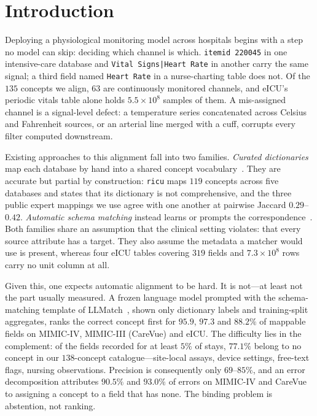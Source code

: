 \section{Introduction}

Deploying a physiological monitoring model across hospitals begins with a step no model
can skip: deciding which channel is which. \texttt{itemid 220045} in one intensive-care
database and \texttt{Vital Signs|Heart Rate} in another carry the same signal; a third
field named \texttt{Heart Rate} in a nurse-charting table does not. Of the $135$ concepts
we align, $63$ are continuously monitored channels, and eICU's periodic vitals table
alone holds $5.5\times10^{8}$ samples of them. A mis-assigned channel is a signal-level
defect: a temperature series concatenated across Celsius and Fahrenheit sources, or an
arterial line merged with a cuff, corrupts every filter computed downstream.

Existing approaches to this alignment fall into two families. \emph{Curated dictionaries}
map each database by hand into a shared concept
vocabulary~\cite{ricu,ohdsi,mimiccode}. They are accurate but partial by construction:
\texttt{ricu} maps $119$ concepts across five databases and states that its dictionary is
not comprehensive, and the three public expert mappings we use agree with one another at
pairwise Jaccard $0.29$--$0.42$. \emph{Automatic schema
matching} instead learns or prompts the correspondence~\cite{rahm2001,llmatch,bdiviz}.
Both families share an assumption that the clinical setting violates: that every source
attribute has a target. They also assume the metadata a matcher would use is present,
whereas four eICU tables covering $319$ fields and $7.3\times10^{8}$ rows carry no unit
column at all.

Given this, one expects automatic alignment to be hard. It is not---at least not the part
usually measured. A frozen language model prompted with the schema-matching template of
LLMatch~\cite{llmatch}, shown only dictionary labels and training-split aggregates, ranks
the correct concept first for $95.9$, $97.3$ and $88.2\%$ of mappable fields on MIMIC-IV,
MIMIC-III (CareVue) and eICU. The difficulty lies in the complement: of the fields
recorded for at least $5\%$ of stays, $77.1\%$ belong to no concept in our $138$-concept
catalogue---site-local assays, device settings, free-text flags, nursing observations.
Precision is consequently only $69$--$85\%$, and an error decomposition attributes
$90.5\%$ and $93.0\%$ of errors on MIMIC-IV and CareVue to assigning a concept to a field
that has none. The binding problem is abstention, not ranking.

